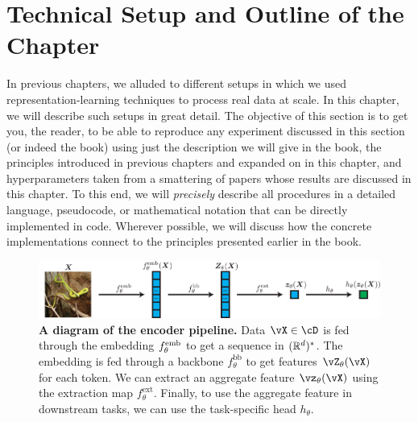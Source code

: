 \documentclass[../../book-main.tex]{subfiles}
\begin{document}



\section{Technical Setup and Outline of the Chapter}\label{sec:experiment_setup}

In previous chapters, we alluded to different setups in which we used representation-learning techniques to process real data at scale. In this chapter, we will describe such setups in great detail. The objective of this section is to get you, the reader, to be able to reproduce any experiment discussed in this section (or indeed the book) using just the description we will give in the book, the principles introduced in previous chapters and expanded on in this chapter, and hyperparameters taken from a smattering of papers whose results are discussed in this chapter. To this end, we will \textit{precisely} describe all procedures in a detailed language, pseudocode, or mathematical notation that can be directly implemented in code. Wherever possible, we will discuss how the concrete implementations connect to the principles presented earlier in the book.

\begin{figure}
    \includegraphics[width=\textwidth]{figs_chap7/encoder_pipeline.pdf}
    \caption{\small\textbf{A diagram of the encoder pipeline.} Data \(\vX \in \cD\) is fed through the embedding \(f_{\theta}^{\mathrm{emb}}\) to get a sequence in \((\mathbb{R}^{d})^{*}\). The embedding is fed through a backbone \(f_{\theta}^{\mathrm{bb}}\) to get features \(\vZ_{\theta}(\vX)\) for each token. We can extract an aggregate feature \(\vz_{\theta}(\vX)\) using the extraction map \(f_{\theta}^{\mathrm{ext}}\). Finally, to use the aggregate feature in downstream tasks, we can use the task-specific head \(h_{\theta}\).}
    \label{fig:overall_encoder_pipeline}
\end{figure}
\end{document}
